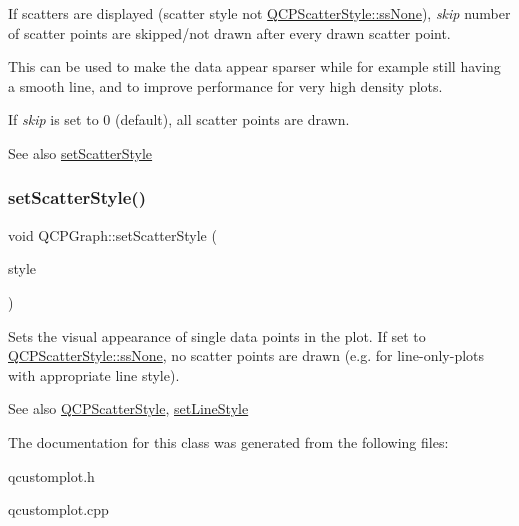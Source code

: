 If scatters are displayed (scatter style not \hyperlink{class_q_c_p_scatter_style_adb31525af6b680e6f1b7472e43859349abd144c291ca274f77053ec68cab6c022}{Q\+C\+P\+Scatter\+Style\+::ss\+None}), {\itshape skip} number of scatter points are skipped/not drawn after every drawn scatter point.

This can be used to make the data appear sparser while for example still having a smooth line, and to improve performance for very high density plots.

If {\itshape skip} is set to 0 (default), all scatter points are drawn.

\begin{DoxySeeAlso}{See also}
\hyperlink{class_q_c_p_graph_a12bd17a8ba21983163ec5d8f42a9fea5}{set\+Scatter\+Style} 
\end{DoxySeeAlso}
\mbox{\label{class_q_c_p_graph_a12bd17a8ba21983163ec5d8f42a9fea5}} 
\subsubsection{\texorpdfstring{set\+Scatter\+Style()}{setScatterStyle()}}
{\footnotesize\ttfamily void Q\+C\+P\+Graph\+::set\+Scatter\+Style (\begin{DoxyParamCaption}\item[{const \hyperlink{class_q_c_p_scatter_style}{Q\+C\+P\+Scatter\+Style} \&}]{style }\end{DoxyParamCaption})}

Sets the visual appearance of single data points in the plot. If set to \hyperlink{class_q_c_p_scatter_style_adb31525af6b680e6f1b7472e43859349abd144c291ca274f77053ec68cab6c022}{Q\+C\+P\+Scatter\+Style\+::ss\+None}, no scatter points are drawn (e.\+g. for line-\/only-\/plots with appropriate line style).

\begin{DoxySeeAlso}{See also}
\hyperlink{class_q_c_p_scatter_style}{Q\+C\+P\+Scatter\+Style}, \hyperlink{class_q_c_p_graph_a513fecccff5b2a50ce53f665338c60ff}{set\+Line\+Style} 
\end{DoxySeeAlso}


The documentation for this class was generated from the following files\+:\begin{DoxyCompactItemize}
\item 
qcustomplot.\+h\item 
qcustomplot.\+cpp\end{DoxyCompactItemize}
